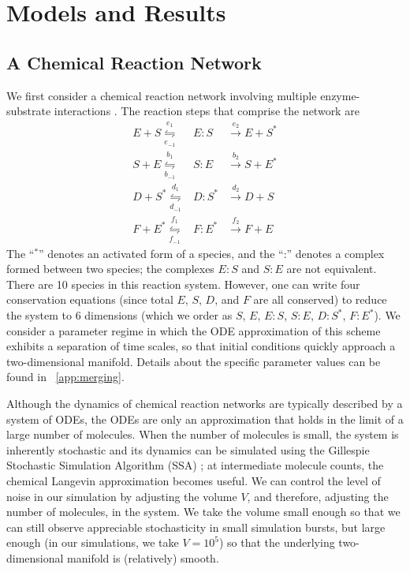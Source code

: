 \section{Models and Results} \label{sec:examples}

\subsection{A Chemical Reaction Network}\label{subsec:rxn_network}

We first consider a chemical reaction network involving  multiple enzyme-substrate interactions \cite{zagaris2012stability}.
%
The reaction steps that comprise the network are\\
\begin{equation}
\begin{array}{rcl}
E + S \overset{e_1}{\underset{e_{-1}}{\leftrightharpoons}} & E:S & \overset{e_2}{\rightarrow} E + S^{*} \\
S + E \overset{b_1}{\underset{b_{-1}}{\leftrightharpoons}} & S:E & \overset{b_2}{\rightarrow} S + E^{*}\\
D + S^{*} \overset{d_1}{\underset{d_{-1}}{\leftrightharpoons}} & D:S^{*} & \overset{d_2}{\rightarrow} D + S\\
F + E^{*} \overset{f_1}{\underset{f_{-1}}{\leftrightharpoons}} & F:E^{*} & \overset{f_2}{\rightarrow} F + E
\end{array}
\end{equation}
The ``$^{*}$'' denotes an activated form of a species, and the ``:'' denotes a complex formed between two species; the complexes $E:S$ and $S:E$ are not equivalent.
%
There are 10 species in this reaction system.
%
However, one can write four conservation equations (since total $E$, $S$, $D$, and $F$ are all conserved) to reduce the system to 6 dimensions
(which we order as $S$, $E$, $E:S$, $S:E$, $D:S^{*}$, $F:E^{*}$).
%
We consider a parameter regime in which the ODE approximation of this scheme exhibits a separation of time scales, so that initial conditions quickly approach a two-dimensional manifold.
%
Details about the specific parameter values can be found in \app~\ref{app:merging}.

Although the dynamics of chemical reaction networks are typically described by a system of ODEs, the ODEs are only an approximation that holds
in the limit of a large number of molecules.
%
When the number of molecules is small, the system is inherently stochastic and its dynamics can be simulated using the
Gillespie Stochastic Simulation Algorithm (SSA) \cite{gillespie1977exact}; at intermediate molecule counts, the chemical Langevin approximation \cite{gillespie2000chemical}
becomes useful.
%
We can control the level of noise in our simulation by adjusting the volume $V$, and therefore, adjusting the number of molecules, in the system.
%
We take the volume small enough so that we can still observe appreciable stochasticity in small simulation bursts, but large enough (in our simulations, we take $V=10^5$) so that the underlying two-dimensional manifold is (relatively) smooth.


